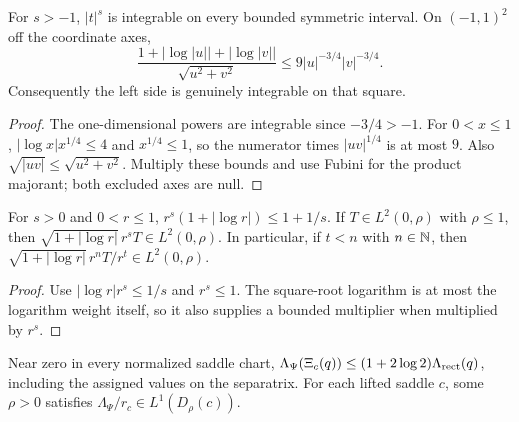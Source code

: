 \begin{lemma}
\label{lem:logarithmic-radial-mass}
\leanok
For $s>-1$, $|t|^s$ is integrable on every bounded symmetric interval.
On $(-1,1)^2$ off the coordinate axes,
\[
 \frac{1+|\log|u||+|\log|v||}{\sqrt{u^2+v^2}}
 \le 9|u|^{-3/4}|v|^{-3/4}.
\]
Consequently the left side is genuinely integrable on that square.
\end{lemma}

\begin{proof}
\leanok
The one-dimensional powers are integrable since $-3/4>-1$.
For $0<x\le1$, $|\log x|x^{1/4}\le4$ and $x^{1/4}\le1$, so the
numerator times $|uv|^{1/4}$ is at most $9$.
Also $\sqrt{|uv|}\le\sqrt{u^2+v^2}$. Multiply these bounds and use
Fubini for the product majorant; both excluded axes are null.
\end{proof}

\begin{lemma}
\label{lem:radial-log-absorption}
\leanok
For $s>0$ and $0<r\le1$,
$r^s(1+|\log r|)\le1+1/s$.
If $T\in L^2(0,\rho)$ with $\rho\le1$, then
$\sqrt{1+|\log r|}\,r^sT\in L^2(0,\rho)$.
In particular, if $t<n$ with $n\in\mathbb{N}$, then
$\sqrt{1+|\log r|}\,r^nT/r^t\in L^2(0,\rho)$.
\end{lemma}

\begin{proof}
\leanok
Use $|\log r|r^s\le1/s$ and $r^s\le1$.
The square-root logarithm is at most the logarithm weight itself,
so it also supplies a bounded multiplier when multiplied by $r^s$.
\end{proof}

\begin{lemma}
\label{lem:saddle-logarithmic-mass}
\leanok
Near zero in every normalized saddle chart,
$\Lambda_\Psi(\Xi_c(q))\le(1+2\log2)\Lambda_{\rm rect}(q)$,
including the assigned values on the separatrix.
For each lifted saddle $c$, some $\rho>0$ satisfies
$\Lambda_\Psi/r_c\in L^1(D_\rho(c))$.
\end{lemma}

